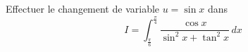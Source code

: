 Effectuer le changement de variable $u=\sin x$ dans
\begin{displaymath}
 I=\int_{\frac{\pi}{6}}^{\frac{\pi}{4}}\frac{\cos x}{\sin^2 x + \tan^2 x}\,dx
\end{displaymath}
\bigskip \bigskip